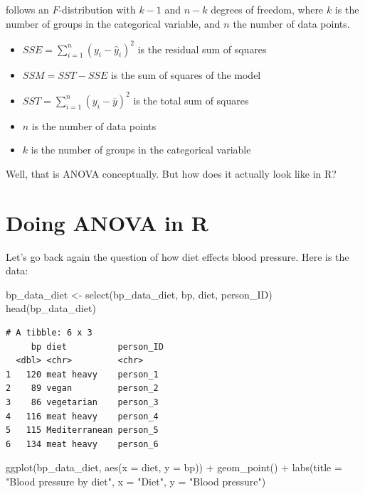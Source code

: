 \documentclass[
  letterpaper,
  8pt,
  a4paper]{book}
\newenvironment{Shaded}{\begin{snugshade}}{\end{snugshade}}
\newcommand{\AttributeTok}[1]{\textcolor[rgb]{0.40,0.45,0.13}{#1}}
\newcommand{\FunctionTok}[1]{\textcolor[rgb]{0.28,0.35,0.67}{#1}}
\newcommand{\NormalTok}[1]{\textcolor[rgb]{0.00,0.23,0.31}{#1}}
\newcommand{\OtherTok}[1]{\textcolor[rgb]{0.00,0.23,0.31}{#1}}
\newcommand{\SpecialCharTok}[1]{\textcolor[rgb]{0.37,0.37,0.37}{#1}}
\newcommand{\StringTok}[1]{\textcolor[rgb]{0.13,0.47,0.30}{#1}}
\providecommand{\tightlist}{%
  \setlength{\itemsep}{0pt}\setlength{\parskip}{0pt}}
\begin{document}
follows an \(F\)-distribution with \(k-1\) and \(n-k\) degrees of
freedom, where \(k\) is the number of groups in the categorical
variable, and \(n\) the number of data points.

\begin{itemize}
\tightlist
\item
  \(SSE=\sum_{i=1} ^n(y_i-\hat{y}_i)^2\) is the residual sum of squares
\item
  \(SSM = SST - SSE\) is the sum of squares of the model
\item
  \(SST=\sum_{i=1}^n(y_i-\overline{y})^2\) is the total sum of squares
\item
  \(n\) is the number of data points
\item
  \(k\) is the number of groups in the categorical variable
\end{itemize}

Well, that is ANOVA conceptually. But how does it actually look like in
R?

\section*{Doing ANOVA in R}\label{doing-anova-in-r}


Let's go back again the question of how diet effects blood pressure.
Here is the data:

\begin{Shaded}
\begin{Highlighting}[]
\NormalTok{bp\_data\_diet }\OtherTok{\textless{}{-}} \FunctionTok{select}\NormalTok{(bp\_data\_diet, bp, diet, person\_ID)}
\FunctionTok{head}\NormalTok{(bp\_data\_diet)}
\end{Highlighting}
\end{Shaded}

\begin{verbatim}
# A tibble: 6 x 3
     bp diet          person_ID
  <dbl> <chr>         <chr>    
1   120 meat heavy    person_1 
2    89 vegan         person_2 
3    86 vegetarian    person_3 
4   116 meat heavy    person_4 
5   115 Mediterranean person_5 
6   134 meat heavy    person_6 
\end{verbatim}

\begin{Shaded}
\begin{Highlighting}[]
\FunctionTok{ggplot}\NormalTok{(bp\_data\_diet, }\FunctionTok{aes}\NormalTok{(}\AttributeTok{x =}\NormalTok{ diet, }\AttributeTok{y =}\NormalTok{ bp)) }\SpecialCharTok{+}
  \FunctionTok{geom\_point}\NormalTok{() }\SpecialCharTok{+}
  \FunctionTok{labs}\NormalTok{(}\AttributeTok{title =} \StringTok{"Blood pressure by diet"}\NormalTok{,}
       \AttributeTok{x =} \StringTok{"Diet"}\NormalTok{,}
       \AttributeTok{y =} \StringTok{"Blood pressure"}\NormalTok{)}
\end{Highlighting}
\end{Shaded}
\end{document}
